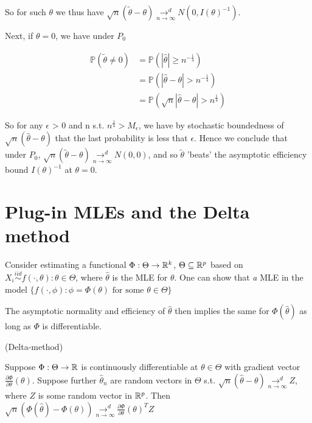 \documentclass[a4paper]{article}
\begin{document}
\begin{remark}
\begin{enumerate}
		 So for such $\theta$ we thus have $\sqrt{n} (\tilde{\theta} - \theta) \underset{n\to \infty}{\to ^{d}} N(0, I(\theta)^{-1})$.

		 Next, if $\theta = 0$, we have under  $P_0$

		 \begin{align*}
		 	\mathbb{P}\left( \tilde{\theta} \neq 0 \right) &= \mathbb{P}\left( |\hat{\theta}| \ge n^{- \frac{1}{4}} \right) \\
			&= \mathbb{P}\left( |\hat{\theta} - \theta| > n^{- \frac{1}{4}} \right) \\
			&= \mathbb{P}\left( \sqrt{n}|\hat{\theta} - \theta| > n^{\frac{1}{4}}  \right)
		 \end{align*}

		 So for any $\epsilon$ > 0 and n s.t. $n^{\frac{1}{4}} > M_{\epsilon}$, we have by stochastic boundedness of $\sqrt{n}(\hat{\theta} - \theta) $ that the last probability is less that $\epsilon$. Hence we conclude that under  $P_0$, $\sqrt{n}(\tilde{\theta} - \theta) \underset{n\to \infty}{\to ^{d}} N(0,0)$, and so $\tilde{\theta}$ 'beats' the asymptotic efficiency bound $I(\theta)^{-1}$ at $\theta = 0$.
	\end{enumerate}
\end{remark}

\section{Plug-in MLEs and the Delta method}

Consider estimating a functional $\Phi : \Theta \to \mathbb{R}^{k}$, $\Theta \subseteq \mathbb{R}^{p}$ based on $X_i \stackrel{iid}{\sim} {f\left( \cdot , \theta \right) : \theta \in \Theta }$, where $\hat{\theta}$ is the MLE for $\theta$. One can show that \textit{a} MLE in the model  $\{f\left( \cdot , \phi \right) : \phi = \Phi(\theta) \text{ for some } \theta \in \Theta \}$

The asymptotic normality and efficiency of  $\hat{\theta}$ then implies the same for $\Phi(\hat{\theta})$ as long as $\Phi$ is differentiable.

\begin{thm}(Delta-method)
	
	Suppose $\Phi : \Theta \to \mathbb{R}$ is continuously differentiable at $\theta \in \Theta$ with gradient vector $\frac{\partial\Phi}{\partial\theta}(\theta)$. Suppose further $\hat{\theta}_n$ are random vectors in $\Theta$ s.t. $\sqrt{n}(\hat{\theta} - \theta) \underset{n\to \infty}{\to ^{d}} Z $, where $Z$ is some random vector in  $\mathbb{R}^{p}$. Then $\sqrt{n}(\Phi(\hat{\theta}) - \Phi(\theta)) \underset{n\to \infty}{\to ^{d}} \frac{\partial\Phi}{\partial\theta}(\theta)^{T} Z$
\end{thm}
\end{document}
